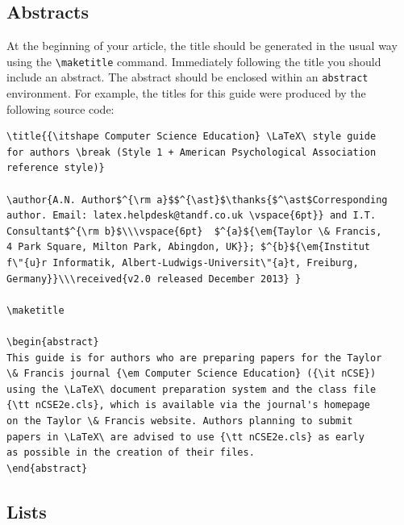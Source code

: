 \documentclass{nCSE2e}
\begin{document}
\subsection{Abstracts}

At the beginning of your article, the title should be generated in the usual way using the {\verb"\maketitle"}
command. Immediately following the title you should include an abstract. The abstract should be enclosed within
an {\tt abstract} environment. For example, the titles for this guide were produced by the following source code:
%
\begin{verbatim}
\title{{\itshape Computer Science Education} \LaTeX\ style guide
for authors \break (Style 1 + American Psychological Association
reference style)}

\author{A.N. Author$^{\rm a}$$^{\ast}$\thanks{$^\ast$Corresponding
author. Email: latex.helpdesk@tandf.co.uk \vspace{6pt}} and I.T.
Consultant$^{\rm b}$\\\vspace{6pt}  $^{a}${\em{Taylor \& Francis,
4 Park Square, Milton Park, Abingdon, UK}}; $^{b}${\em{Institut
f\"{u}r Informatik, Albert-Ludwigs-Universit\"{a}t, Freiburg,
Germany}}\\\received{v2.0 released December 2013} }

\maketitle

\begin{abstract}
This guide is for authors who are preparing papers for the Taylor
\& Francis journal {\em Computer Science Education} ({\it nCSE})
using the \LaTeX\ document preparation system and the class file
{\tt nCSE2e.cls}, which is available via the journal's homepage
on the Taylor \& Francis website. Authors planning to submit
papers in \LaTeX\ are advised to use {\tt nCSE2e.cls} as early
as possible in the creation of their files.
\end{abstract}
\end{verbatim}


\subsection{Lists}
\end{document}
